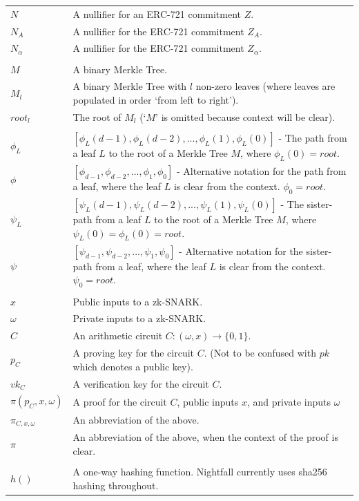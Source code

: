 \documentclass{article}
\begin{document}
\begin{center}
\begin{tabular}{lp{14cm}}
    $N$         & A nullifier for an ERC-721 commitment $Z$.\\
    $N_A$       & A nullifier for the ERC-721 commitment $Z_A$.\\
    $N_{\alpha}$ & A nullifier for the ERC-721 commitment $Z_{\alpha}$.\\
    \\
		$M$         & A binary Merkle Tree.\\
    $M_l$       & A binary Merkle Tree with $l$ non-zero leaves (where leaves are populated in order `from left to right').\\
    $root_l$    & The root of $M_l$ (`$M$' is omitted because context will be clear).\\
    \\
    $\phi_{L}$  & $[\phi_{L}(d-1), \phi_{L}(d-2),..., \phi_{L}(1), \phi_{L}(0)]$ - The path from a leaf $L$ to the root of a Merkle Tree $M$, where $\phi_L(0) = root$.\\
    $\phi$      & $[\phi_{d-1}, \phi_{d-2},..., \phi_{1}, \phi_0]$ - Alternative notation for the path from a leaf, where the leaf $L$ is clear from the context. $\phi_0 = root$.\\
    $\psi_{L}$  & $[\psi_{L}(d-1), \psi_{L}(d-2),..., \psi_{L}(1), \psi_{L}(0)]$ - The sister-path from a leaf $L$ to the root of a Merkle Tree $M$, where $\psi_L(0) = \phi_L(0) = root$.\\
    $\psi$      &  $[\psi_{d-1}, \psi_{d-2},..., \psi_{1}, \psi_0]$ - Alternative notation for the sister-path from a leaf, where the leaf $L$ is clear from the context. $\psi_0 = root$.\\
    \\
		$x$         & Public inputs to a zk-SNARK. \\
		$\omega$    & Private inputs to a zk-SNARK.\\
		$C$         &  An arithmetic circuit $C: (\omega, x) \to \{0,1\}$.\\
		$p_C$       & A proving key for the circuit $C$. (Not to be confused with $pk$ which denotes a public key). \\
		$vk_C$      & A verification key for the circuit $C$. \\
    $\pi(p_C, x, \omega)$ & A proof for the circuit $C$, public inputs $x$, and private inputs $\omega$ \\
    $\pi_{C, x, \omega}$ & An abbreviation of the above. \\
    $\pi$       & An abbreviation of the above, when the context of the proof is clear. \\
    \\
    $h()$       & A one-way hashing function. Nightfall currently uses sha256 hashing throughout.\\
	\end{tabular}
\end{center}
\end{document}

